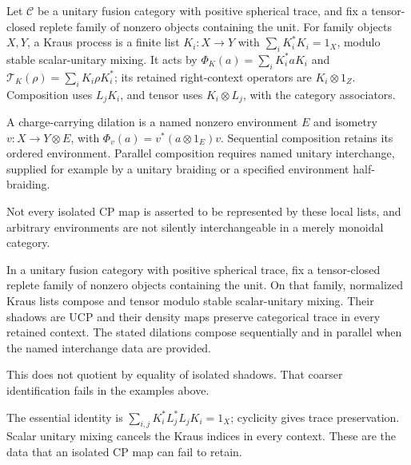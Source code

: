 \begin{definition}
Let $\mathcal C$ be a unitary fusion category with positive spherical trace,
and fix a tensor-closed replete family of nonzero objects containing the unit.
For family objects $X,Y$, a Kraus process is a finite list
$K_i:X\to Y$ with $\sum_iK_i^*K_i=1_X$, modulo stable scalar-unitary
mixing. It acts by $\Phi_K(a)=\sum_iK_i^*aK_i$ and
$\mathcal T_K(\rho)=\sum_iK_i\rho K_i^*$; its retained right-context
operators are $K_i\otimes1_Z$. Composition uses $L_jK_i$, and tensor
uses $K_i\otimes L_j$, with the category associators.

A charge-carrying dilation is a named nonzero environment $E$ and
isometry $v:X\to Y\otimes E$, with
$\Phi_v(a)=v^*(a\otimes1_E)v$. Sequential composition retains its
ordered environment. Parallel composition requires named unitary
interchange, supplied for example by a unitary braiding or a specified
environment half-braiding.
\end{definition}
\begin{scope}Not every isolated CP map is asserted to be represented
by these local lists, and arbitrary environments are not silently
interchangeable in a merely monoidal category.\end{scope}

\begin{theorem}
{\normalfont\statusProved}\quad In a unitary fusion category with positive
spherical trace, fix a tensor-closed replete family of nonzero objects
containing the unit. On that family,
normalized Kraus lists compose and tensor modulo stable scalar-unitary
mixing. Their shadows are UCP and their density maps preserve categorical
trace in every retained context. The stated dilations compose sequentially
and in parallel when the named interchange data are provided.
\end{theorem}
\begin{scope}This does not quotient by equality of isolated shadows.
That coarser identification fails in the examples above.\end{scope}

The essential identity is
$\sum_{i,j}K_i^*L_j^*L_jK_i=1_X$; cyclicity gives trace preservation.
Scalar unitary mixing cancels the Kraus indices in every context. These
are the data that an isolated CP map can fail to retain.

